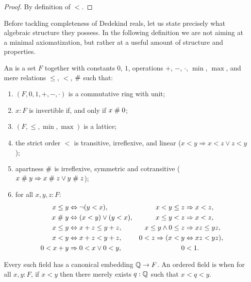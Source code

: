 \begin{proof}
  By definition of $<$.
\end{proof}

Before tackling completeness of Dedekind reals, let us state precisely what algebraic
structure they possess. In the following definition we are not aiming at a minimal
axiomatization, but rather at a useful amount of structure and properties.

\begin{defn} \label{ordered-field} An 
  is a set $F$ together with
  constants $0$, $1$, operations $+$, $-$, $\cdot$, $\min$, $\max$, and mere relations
  $\leq$, $<$, $\mathrel{\#}$ such that:
  \begin{enumerate}
  \item $(F, 0, 1, {+}, {-}, {\cdot})$ is a commutative ring with unit;
  \item $x : F$ is invertible if, and only if $x \mathrel{\#} 0$;
  \item $(F, {\leq}, {\min}, {\max})$ is a lattice;
  \item the strict order $<$ is transitive, irreflexive, and linear ($x < y \Rightarrow x < z \lor z < y$);
  \item apartness $\mathrel{\#}$ is irreflexive, symmetric and cotransitive ($x \mathrel{\#} y \Rightarrow x \mathrel{\#} z \lor y \mathrel{\#} z$);
  \item for all $x, y, z : F$:
    \begin{align*}
      x \leq y &\Leftrightarrow \lnot (y < x), &
      x < y \leq z &\Rightarrow x < z, \\
      x \mathrel{\#} y &\Leftrightarrow (x < y) \lor (y < x), &
      x \leq y < z &\Rightarrow x < z, \\
      x \leq y &\Leftrightarrow x + z \leq y + z, &
      x \leq y \land 0 \leq z &\Rightarrow x z \leq y z, \\
      x < y &\Leftrightarrow x + z < y + z, &
      0 < z \Rightarrow (x < y &\Leftrightarrow x z < y z), \\
      0 < x + y &\Rightarrow 0 < x \lor 0 < y, &
      0 &< 1.
    \end{align*}
  \end{enumerate}
  Every such field has a canonical embedding $\mathbb{Q} \to F$. An ordered field is
  when for all $x, y : F$, if $x < y$ then there merely exists $q :
  \mathbb{Q}$ such that $x < q < y$.
\end{defn}

